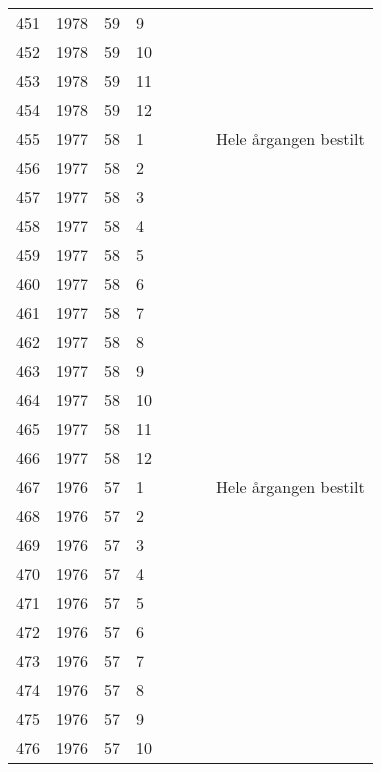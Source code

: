 \begin{longtable}{ |l|l|l|l|l|l|l|l| }
451 & 1978 & 59 &     9 &         &                &   & \\
452 & 1978 & 59 &    10 &         &                &  & \\
453 & 1978 & 59 &    11 &         &                &  & \\
454 & 1978 & 59 &    12 &         &                &  & \\
455 & 1977 & 58 &     1 &         &                &  & Hele årgangen bestilt \\
456 & 1977 & 58 &     2 &         &                &  & \\
457 & 1977 & 58 &     3 &         &                &  & \\
458 & 1977 & 58 &     4 &         &                &  & \\
459 & 1977 & 58 &     5 &         &                &  & \\
460 & 1977 & 58 &     6 &         &                &  & \\
461 & 1977 & 58 &     7 &         &                &  & \\
462 & 1977 & 58 &     8 &         &                &  & \\
463 & 1977 & 58 &     9 &         &                &  & \\
464 & 1977 & 58 &    10 &         &                &  & \\
465 & 1977 & 58 &    11 &         &                &  & \\
466 & 1977 & 58 &    12 &         &                &  & \\
467 & 1976 & 57 &     1 &         &                &  & Hele årgangen bestilt\\
468 & 1976 & 57 &     2 &         &                &  & \\
469 & 1976 & 57 &     3 &         &                &  & \\
470 & 1976 & 57 &     4 &         &                &  & \\
471 & 1976 & 57 &     5 &         &                &  & \\
472 & 1976 & 57 &     6 &         &                &  & \\
473 & 1976 & 57 &     7 &         &                &  & \\
474 & 1976 & 57 &     8 &         &                &  & \\
475 & 1976 & 57 &     9 &         &                &  & \\
476 & 1976 & 57 &    10 &         &                &  & \\

\end{longtable}
